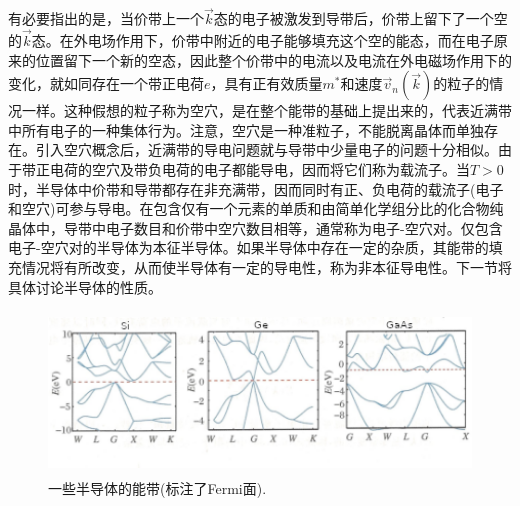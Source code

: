 有必要指出的是，当价带上一个$\vec k$态的电子被激发到导带后，价带上留下了一个空的$\vec k$态。在外电场作用下，价带中附近的电子能够填充这个空的能态，而在电子原来的位置留下一个新的空态，因此整个价带中的电流以及电流在外电磁场作用下的变化，就如同存在一个带正电荷$e$，具有正有效质量$m^{\ast}$和速度$\vec v_n(\vec k)$的粒子的情况一样。这种假想的粒子称为空穴，是在整个能带的基础上提出来的，代表近满带中所有电子的一种集体行为。注意，空穴是一种准粒子，不能脱离晶体而单独存在。引入空穴概念后，近满带的导电问题就与导带中少量电子的问题十分相似。由于带正电荷的空穴及带负电荷的电子都能导电，因而将它们称为载流子。当$T>0$时，半导体中价带和导带都存在非充满带，因而同时有正、负电荷的载流子(电子和空穴)可参与导电。在包含仅有一个元素的单质和由简单化学组分比的化合物纯晶体中，导带中电子数目和价带中空穴数目相等，通常称为电子-空穴对。仅包含电子-空穴对的半导体为本征半导体。如果半导体中存在一定的杂质，其能带的填充情况将有所改变，从而使半导体有一定的导电性，称为非本征导电性。下一节将具体讨论半导体的性质。
\begin{figure}[h!]
\centering
\vspace*{-0.10in}
\includegraphics[height=1.70in,width=4.70in,viewport=0 0 105 35,clip]{Figures/Band_Structure-semi_conductor.png}
\caption{\small \textrm{一些半导体的能带(标注了Fermi面).}}%
\label{Fig:Band_structure-semi_conductor}
\end{figure}

